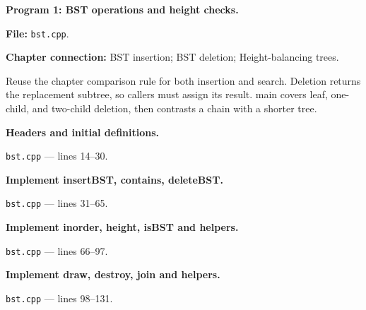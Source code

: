 \textbf{Program 1: BST operations and height checks.}

\textbf{File:} \texttt{bst.cpp}.

\textbf{Chapter connection:} BST insertion; BST deletion; Height-balancing trees.

Reuse the chapter comparison rule for both insertion and search. Deletion returns the replacement subtree, so callers must assign its result. main covers leaf, one-child, and two-child deletion, then contrasts a chain with a shorter tree.



\begin{utpsteps}\setcounter{enumi}{0}\item \textbf{Headers and initial definitions.}\end{utpsteps}

\texttt{bst.cpp} --- lines 14--30.




\tcbbreak

\begin{utpsteps}\setcounter{enumi}{1}\item \textbf{Implement insertBST, contains, deleteBST.}\end{utpsteps}

\texttt{bst.cpp} --- lines 31--65.






\tcbbreak

\begin{utpsteps}\setcounter{enumi}{2}\item \textbf{Implement inorder, height, isBST and helpers.}\end{utpsteps}

\texttt{bst.cpp} --- lines 66--97.




\tcbbreak

\begin{utpsteps}\setcounter{enumi}{3}\item \textbf{Implement draw, destroy, join and helpers.}\end{utpsteps}

\texttt{bst.cpp} --- lines 98--131.




